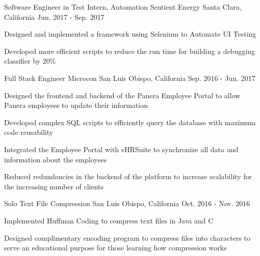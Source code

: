 


\begin{cventries}


\cventry
{Software Engineer in Test Intern, Automation} %
{Sentient Energy} %
{Santa Clara, California} %
{Jun. 2017 - Sep. 2017} %
{ %
\begin{cvitems}
\item {Designed and implemented a framework using Selenium to Automate UI Testing}
\item {Developed more efficient scripts to reduce the run time for building a debugging classifier by 20\%}
\end{cvitems}
}


\cventry
{Full Stack Engineer} %
{Microcon} %
{San Luis Obispo, California} %
{Sep. 2016 - Jun. 2017} %
{ %
\begin{cvitems}
\item {Designed the frontend and backend of the Panera Employee Portal to allow Panera employees to update their information}
\item {Developed complex SQL scripts to efficiently query the database with maximum code reusability}
\item {Integrated the Employee Portal with eHRSuite to synchronize all data and information about the employees}
\item {Reduced redundancies in the backend of the platform to increase scalability for the increasing number of clients}
\end{cvitems}
}


\cventry
{Solo} %
{Text File Compression} %
{San Luis Obispo, California} %
{Oct. 2016 - Nov. 2016} %
{ %
\begin{cvitems}
\item {Implemented Huffman Coding to compress text files in Java and C}
\item {Designed complimentary encoding program to compress files into characters to serve an educational purpose for those learning how compression works}
\item {}
\end{cvitems}
}







\end{cventries}
